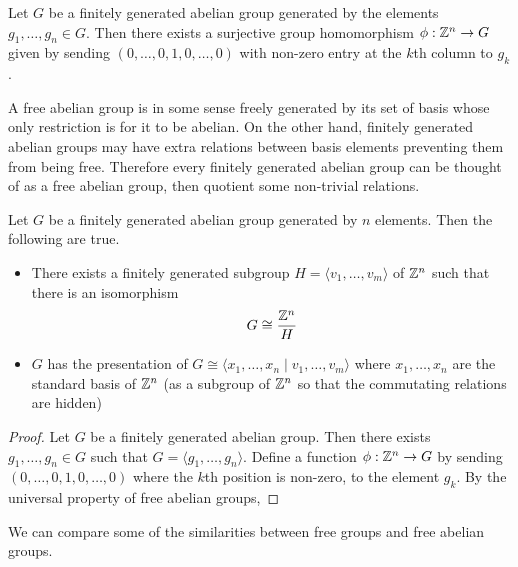 \documentclass[a4paper]{article}
\begin{document}
\begin{prp}{}{} Let $G$ be a finitely generated abelian group generated by the elements $g_1,\dots,g_n\in G$. Then there exists a surjective group homomorphism $\phi:\mathbb{Z}^n\to G$ given by sending $(0,\dots,0,1,0,\dots,0)$ with non-zero entry at the $k$th column to $g_k$. 
\end{prp}

A free abelian group is in some sense freely generated by its set of basis whose only restriction is for it to be abelian. On the other hand, finitely generated abelian groups may have extra relations between basis elements preventing them from being free. Therefore every finitely generated abelian group can be thought of as a free abelian group, then quotient some non-trivial relations. 

\begin{prp}{}{} Let $G$ be a finitely generated abelian group generated by $n$ elements. Then the following are true. 
\begin{itemize}
\item There exists a finitely generated subgroup $H=\langle v_1,\dots,v_m\rangle$ of $\mathbb{Z}^n$ such that there is an isomorphism $$G\cong\frac{\mathbb{Z}^n}{H}$$
\item $G$ has the presentation of $G\cong\langle x_1,\dots,x_n\;|\;v_1,\dots,v_m\rangle$ where $x_1,\dots,x_n$ are the standard basis of $\mathbb{Z}^n$ (as a subgroup of $\mathbb{Z}^n$ so that the commutating relations are hidden)
\end{itemize} 
\begin{proof}
Let $G$ be a finitely generated abelian group. Then there exists $g_1,\dots,g_n\in G$ such that $G=\langle g_1,\dots,g_n\rangle$. Define a function $\phi:\mathbb{Z}^n\to G$ by sending $(0,\dots,0,1,0,\dots,0)$ where the $k$th position is non-zero, to the element $g_k$. By the universal property of free abelian groups, 
\end{proof}
\end{prp}

We can compare some of the similarities between free groups and free abelian groups. 
\end{document}
